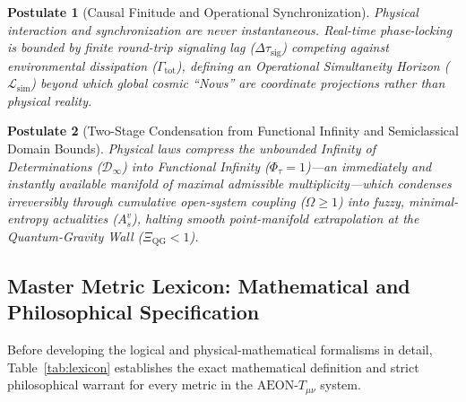 \documentclass[11pt,a4paper]{article}
\newtheorem{postulate}{Postulate}
\begin{document}
\begin{postulate}[Causal Finitude and Operational Synchronization]
Physical interaction and synchronization are never instantaneous. Real-time phase-locking is bounded by finite round-trip signaling lag ($\Delta\tau_{\mathrm{sig}}$) competing against environmental dissipation ($\Gamma_{\mathrm{tot}}$), defining an \emph{Operational Simultaneity Horizon} ($\mathcal{L}_{\mathrm{sim}}$) beyond which global cosmic ``Nows'' are coordinate projections rather than physical reality.
\end{postulate}

\begin{postulate}[Two-Stage Condensation from Functional Infinity and Semiclassical Domain Bounds]
Physical laws compress the unbounded Infinity of Determinations ($\mathcal{D}_\infty$) into \emph{Functional Infinity} ($\Phi_\tau = 1$)---an immediately and instantly available manifold of maximal admissible multiplicity---which condenses irreversibly through cumulative open-system coupling ($\Omega \ge 1$) into fuzzy, minimal-entropy actualities ($A_s^v$), halting smooth point-manifold extrapolation at the \emph{Quantum-Gravity Wall} ($\Xi_{\mathrm{QG}} < 1$).
\end{postulate}

\subsection{Master Metric Lexicon: Mathematical and Philosophical Specification}

Before developing the logical and physical-mathematical formalisms in detail, Table~\ref{tab:lexicon} establishes the exact mathematical definition and strict philosophical warrant for every metric in the $\text{AEON-}T_{\mu\nu}$ system.
\end{document}
